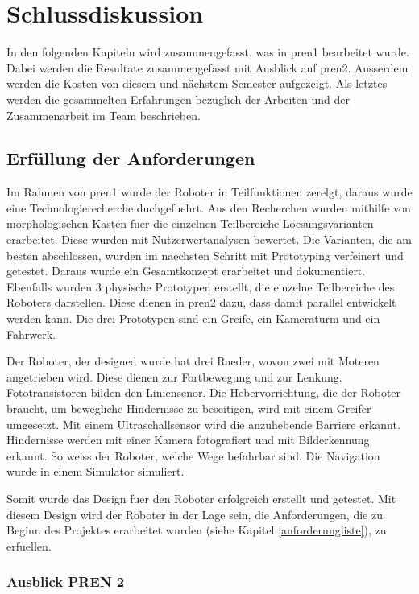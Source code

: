 \section{Schlussdiskussion}

In den folgenden Kapiteln wird zusammengefasst, was in \acrshort{pren1} bearbeitet wurde.
Dabei werden die Resultate zusammengefasst mit Ausblick auf \acrshort{pren2}.
Ausserdem werden die Kosten von diesem und nächstem Semester aufgezeigt.
Als letztes werden die gesammelten Erfahrungen bezüglich der Arbeiten und der Zusammenarbeit im Team beschrieben.

\subsection{Erfüllung der Anforderungen}

Im Rahmen von \acrshort{pren1} wurde der Roboter in Teilfunktionen zerelgt, daraus wurde eine Technologierecherche duchgefuehrt. Aus den Recherchen wurden mithilfe von morphologischen Kasten fuer die einzelnen Teilbereiche Loesungsvarianten erarbeitet. Diese wurden mit Nutzerwertanalysen bewertet. Die Varianten, die am besten abschlossen, wurden im naechsten Schritt mit Prototyping verfeinert und getestet. Daraus wurde ein Gesamtkonzept erarbeitet und dokumentiert. Ebenfalls wurden 3 physische Prototypen erstellt, die einzelne Teilbereiche des Roboters darstellen. Diese dienen in \acrshort{pren2} dazu, dass damit parallel entwickelt werden kann. Die drei Prototypen sind ein Greife, ein Kameraturm und ein Fahrwerk.

Der Roboter, der designed wurde hat drei Raeder, wovon zwei mit Moteren angetrieben wird. Diese dienen zur Fortbewegung und zur Lenkung. Fototransistoren bilden den Liniensenor.
Die Hebervorrichtung, die der Roboter braucht, um bewegliche Hindernisse zu beseitigen, wird mit einem Greifer umgesetzt. Mit einem Ultraschallsensor wird die anzuhebende Barriere erkannt. 
Hindernisse werden mit einer Kamera fotografiert und mit Bilderkennung erkannt. So weiss der Roboter, welche Wege befahrbar sind. Die Navigation wurde in einem Simulator simuliert.

Somit wurde das Design fuer den Roboter erfolgreich erstellt und getestet. Mit diesem Design wird der Roboter in der Lage sein, die Anforderungen, die zu Beginn des Projektes erarbeitet wurden (siehe Kapitel \ref{anforderungliste}), zu erfuellen.

\subsubsection{Ausblick PREN 2}

